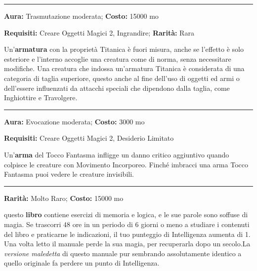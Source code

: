 \begin{multicols}{2}
\smallskip\noindent\rule{\linewidth}{2pt}  \hypertarget{Armatura Titanica}{}\smallskip{}\noindent\label{ArmaturaTitanica}

\textbf{Aura:} Trasmutazione moderata; \textbf{Costo:} 15000 mo

\textbf{Requisiti:} Creare Oggetti Magici 2, Ingrandire; \textbf{Rarità:} Rara

Un'\textbf{armatura} con la proprietà Titanica è fuori misura, anche se l'effetto è solo esteriore e l'interno accoglie una creatura come di norma, senza necessitare modifiche. Una creatura che indossa un'armatura Titanica è considerata di una categoria di taglia superiore, questo anche al fine dell'uso di oggetti ed armi o dell'essere influenzati da attacchi speciali che dipendono dalla taglia, come Inghiottire e Travolgere.

\smallskip\noindent\rule{\linewidth}{2pt}  \hypertarget{ToccoFantasma}{}\smallskip{}\noindent\label{ToccoFantasma}

\textbf{Aura:} Evocazione moderata; \textbf{Costo:} 3000 mo

\textbf{Requisiti:} Creare Oggetti Magici 2, Desiderio Limitato

Un'\textbf{arma} del Tocco Fantasma infligge un danno critico aggiuntivo quando colpisce le creature con Movimento Incorporeo. Finché imbracci una arma Tocco Fantasma puoi vedere le creature invisibili.

\smallskip\noindent\rule{\linewidth}{2pt}  \hypertarget{TomodelPensieroLimpido}{}\smallskip{}\noindent\label{TomodelPensieroLimpido}

\textbf{Rarità:} Molto Raro; \textbf{Costo:} 15000 mo

questo \textbf{libro} contiene esercizi di memoria e logica, e le sue parole sono soffuse di magia. Se trascorri 48 ore in un periodo di 6 giorni o meno a studiare i contenuti del libro e praticarne le indicazioni, il tuo punteggio di Intelligenza aumenta di 1. Una volta letto il manuale perde la sua magia, per recuperarla dopo un secolo.La \emph{versione maledetta} di questo manuale pur sembrando assolutamente identico a quello originale fa perdere un punto di Intelligenza.


\end{multicols}
